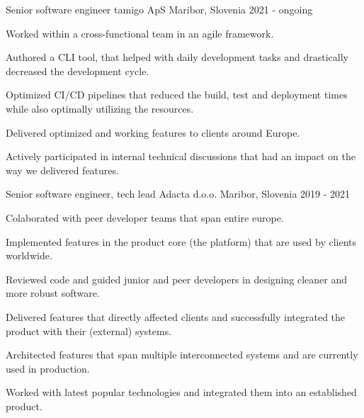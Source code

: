 

\begin{cventries}

  \cventry
    {Senior software engineer} %
    {tamigo ApS} %
    {Maribor, Slovenia} %
    {2021 - ongoing} %
    {
      \begin{cvitems}          
        \item {Worked within a cross-functional team in an agile framework.}
        \item {Authored a CLI tool, that helped with daily development tasks 
        and drastically decreased the development cycle.}
        \item {Optimized CI/CD pipelines that reduced the build, test 
        and deployment times while also optimally utilizing the resources.}
        \item {Delivered optimized and working features to clients around Europe.}
        \item {Actively participated in internal technical discussions that had 
        an impact on the way we delivered features.}
      \end{cvitems}
    }

  \cventry
    {Senior software engineer, tech lead} %
    {Adacta d.o.o.} %
    {Maribor, Slovenia} %
    {2019 - 2021} %
    {
      \begin{cvitems}          
        \item {Colaborated with peer developer teams that span entire europe.}
        \item {Implemented features in the product core (the platform) 
        that are used by clients worldwide.}
        \item {Reviewed code and guided junior and peer developers 
        in designing cleaner and more robust software.}
        \item {Delivered features that directly affected clients and 
        successfully integrated the product with their (external) systems.}
        \item {Architected features that span multiple interconnected 
        systems and are currently used in production.}
        \item {Worked with latest popular technologies and integrated 
        them into an established product.}
      \end{cvitems}
    }


\end{cventries}
